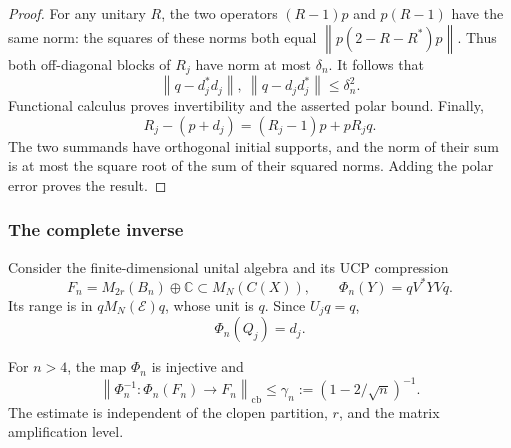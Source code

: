 \begin{proof}
For any unitary $R$, the two operators $(R-1)p$ and $p(R-1)$ have the same
norm: the squares of these norms both equal $\left\|p(2-R-R^*)p\right\|$.
Thus both off-diagonal blocks of $R_j$ have norm at most $\delta_n$. It
follows that 
\begin{equation*}
\left\|q-d_j^*d_j\right\|,\ \left\|q-d_jd_j^*\right\|\leq\delta_n^2.
\end{equation*}
Functional calculus proves invertibility and the asserted polar bound.
Finally, 
\begin{equation*}
R_j-(p+d_j)=(R_j-1)p+pR_jq.
\end{equation*}
The two summands have orthogonal initial supports, and the norm of their sum
is at most the square root of the sum of their squared norms. Adding the
polar error proves the result.
\end{proof}


\subsubsection{The complete inverse}

Consider the finite-dimensional unital algebra and its UCP compression 
\begin{equation}  \label{eq:cu-compression}
F_n=M_{2r}(B_n)\oplus\mathbb{C}\subset M_N(C(X)),\qquad \Phi_n(Y)=qV^*YVq.
\end{equation}
Its range is in $qM_N(\mathcal{E})q$, whose unit is $q$. Since $U_jq=q$, 
\begin{equation}  \label{eq:cu-compression-tuple}
\Phi_n(Q_j)=d_j.
\end{equation}

\begin{theorem}\label{thm:cu-inverse}
 For $n>4$, the map $\Phi_n$ is injective and 
\begin{equation*}
\left\|\Phi_n^{-1}:\Phi_n(F_n)\to F_n\right\|_{\mathrm{cb}} \leq
\gamma_n:=(1-2/\sqrt n)^{-1}.
\end{equation*}
The estimate is independent of the clopen partition, $r$, and the matrix
amplification level.
\end{theorem}

